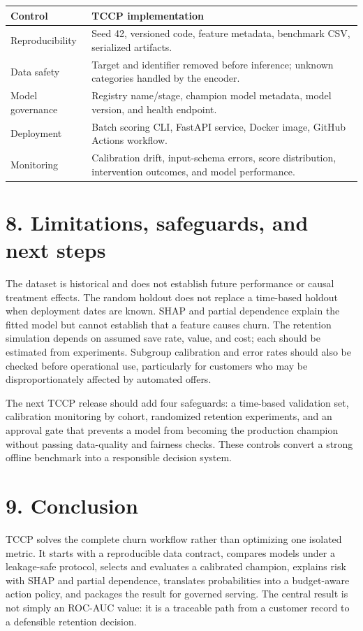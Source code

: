 \documentclass[9pt]{article}
\begin{document}
\begin{center}
\begin{tabular}{p{}p{}}
\toprule
\textbf{Control} & \textbf{TCCP implementation}\\
\midrule
Reproducibility & Seed 42, versioned code, feature metadata, benchmark CSV, serialized artifacts.\\
Data safety & Target and identifier removed before inference; unknown categories handled by the encoder.\\
Model governance & Registry name/stage, champion model metadata, model version, and health endpoint.\\
Deployment & Batch scoring CLI, FastAPI service, Docker image, GitHub Actions workflow.\\
Monitoring & Calibration drift, input-schema errors, score distribution, intervention outcomes, and model performance.\\
\bottomrule
\end{tabular}
\end{center}

\section*{8. Limitations, safeguards, and next steps}
The dataset is historical and does not establish future performance or causal treatment effects. The random holdout does not replace a time-based holdout when deployment dates are known. SHAP and partial dependence explain the fitted model but cannot establish that a feature causes churn. The retention simulation depends on assumed save rate, value, and cost; each should be estimated from experiments. Subgroup calibration and error rates should also be checked before operational use, particularly for customers who may be disproportionately affected by automated offers.

The next TCCP release should add four safeguards: a time-based validation set, calibration monitoring by cohort, randomized retention experiments, and an approval gate that prevents a model from becoming the production champion without passing data-quality and fairness checks. These controls convert a strong offline benchmark into a responsible decision system.

\section*{9. Conclusion}
TCCP solves the complete churn workflow rather than optimizing one isolated metric. It starts with a reproducible data contract, compares models under a leakage-safe protocol, selects and evaluates a calibrated champion, explains risk with SHAP and partial dependence, translates probabilities into a budget-aware action policy, and packages the result for governed serving. The central result is not simply an ROC-AUC value: it is a traceable path from a customer record to a defensible retention decision.
\end{document}
